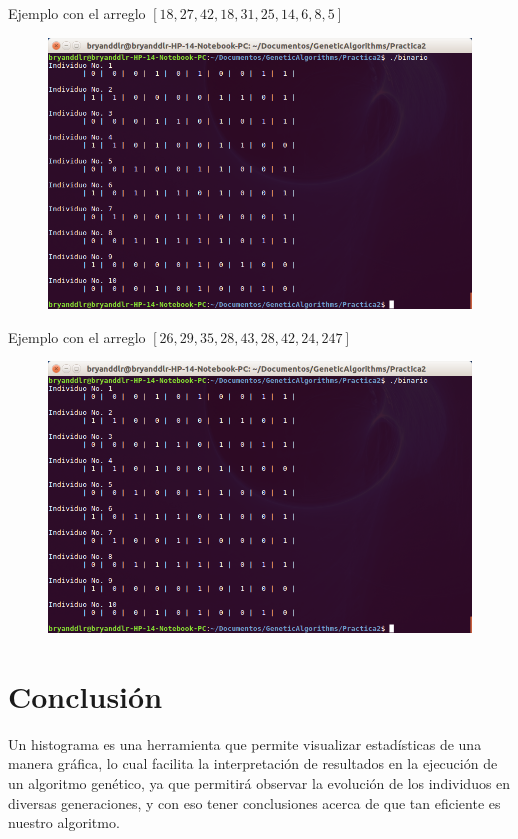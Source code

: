 \documentclass[11pt,letterpaper]{article}
\begin{document}
Ejemplo con el arreglo $\left[18,27,42,18,31,25,14,6,8,5 \right]$
\begin{figure}[H]
	\centering
	\includegraphics[scale = 0.3]{images/ej1}
\end{figure}

Ejemplo con el arreglo $\left[26,29,35,28,43,28,42,24,247 \right]$
\begin{figure}[H]
	\centering
	\includegraphics[scale = 0.3]{images/ej1}
\end{figure}

\section*{Conclusión}
Un histograma es una herramienta que permite visualizar estadísticas de una manera gráfica, lo cual facilita la interpretación de resultados en la ejecución de un algoritmo genético, ya que permitirá observar la evolución de los individuos en diversas generaciones, y con eso tener conclusiones acerca de que tan eficiente es nuestro algoritmo.
\end{document}
